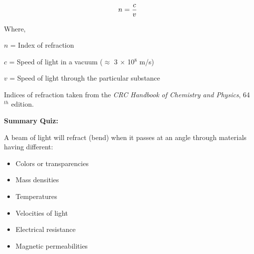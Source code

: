 $$n = {c \over v}$$

\noindent
Where,

$n$ = Index of refraction

$c$ = Speed of light in a vacuum ($\approx$ 3 $\times$ 10$^{8}$ m/s)

$v$ = Speed of light through the particular substance

\vskip 20pt

Indices of refraction taken from the {\it CRC Handbook of Chemistry and Physics}, 64$^{th}$ edition.







\vfil \eject

\noindent
{\bf Summary Quiz:}

A beam of light will refract (bend) when it passes at an angle through materials having different:

\begin{itemize}
\item{} Colors or transparencies
\vskip 5pt 
\item{} Mass densities
\vskip 5pt 
\item{} Temperatures
\vskip 5pt 
\item{} Velocities of light
\vskip 5pt 
\item{} Electrical resistance
\vskip 5pt 
\item{} Magnetic permeabilities
\end{itemize}




